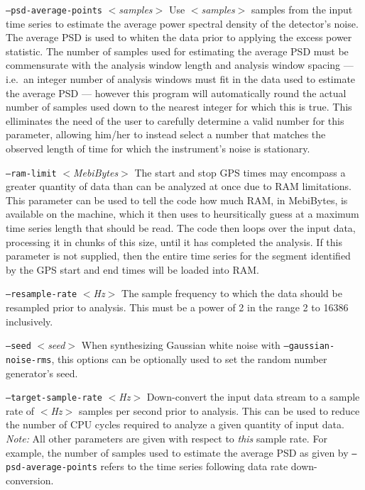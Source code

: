 \documentclass{article}
\newcommand{\option}[1]{\texttt{#1}}
\newcommand{\parm}[1]{$<$\textit{#1}$>$}
\newenvironment{entry}%
  {\begin{list}{}{\renewcommand{\makelabel}[1]%
    {\parbox[b]{\labelwidth}{\makebox[0pt][l]{\textbf{##1}}\\}}%
    \setlength{\labelwidth}{1em}%
    \setlength{\labelsep}{1em}%
    \setlength{\leftmargin}{2em}%
    \setlength{\topsep}{\medskipamount}%
    \setlength{\itemsep}{\medskipamount}%
    \setlength{\parsep}{\medskipamount}%
    \setlength{\listparindent}{0pt}}}
  {\end{list}}
\begin{document}
\begin{entry}
\begin{entry}
\item[\option{--psd-average-points} \parm{samples}]
Use \parm{samples} samples from the input time series to estimate the
average power spectral density of the detector's noise.  The average PSD is
used to whiten the data prior to applying the excess power statistic.  The
number of samples used for estimating the average PSD must be commensurate
with the analysis window length and analysis window spacing --- i.e.\ an
integer number of analysis windows must fit in the data used to estimate
the average PSD --- however this program will automatically round the
actual number of samples used down to the nearest integer for which this is
true.  This elliminates the need of the user to carefully determine a valid
number for this parameter, allowing him/her to instead select a number that
matches the observed length of time for which the instrument's noise is
stationary.

\item[\option{--ram-limit} \parm{MebiBytes}]
The start and stop GPS times may encompass a greater quantity of data than
can be analyzed at once due to RAM limitations.  This parameter can be used
to tell the code how much RAM, in MebiBytes, is available on the machine,
which it then uses to heursitically guess at a maximum time series length
that should be read.  The code then loops over the input data, processing
it in chunks of this size, until it has completed the analysis.  If this
parameter is not supplied, then the entire time series for the segment
identified by the GPS start and end times will be loaded into RAM.

\item[\option{--resample-rate} \parm{Hz}]
The sample frequency to which the data should be resampled prior to
analysis.  This must be a power of 2 in the range \unit{2}{\hertz} to
\unit{16386}{\hertz} inclusively.

\item[\option{--seed} \parm{seed}]
When synthesizing Gaussian white noise with \option{--gaussian-noise-rms},
this options can be optionally used to set the random number generator's
seed.

\item[\option{--target-sample-rate} \parm{Hz}]
Down-convert the input data stream to a sample rate of \parm{Hz} samples
per second prior to analysis.  This can be used to reduce the number of CPU
cycles required to analyze a given quantity of input data.  \emph{Note:}
All other parameters are given with respect to \emph{this} sample rate.
For example, the number of samples used to estimate the average PSD as
given by \option{--psd-average-points} refers to the time series following
data rate down-conversion.


\end{entry}
\end{entry}
\end{document}
